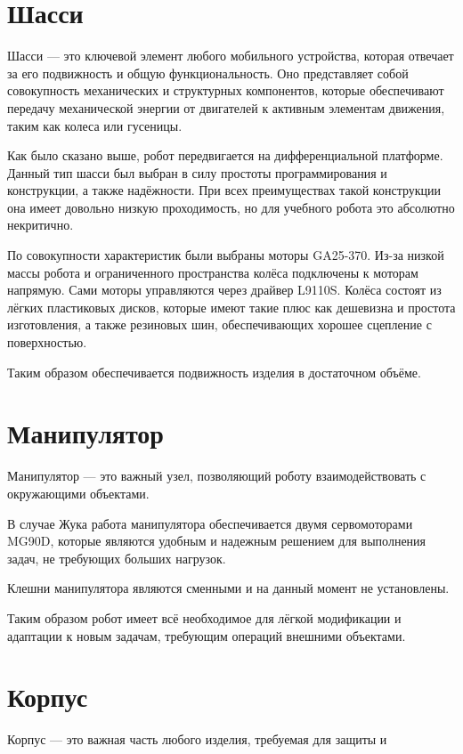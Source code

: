 \section{Шасси}

Шасси --- это ключевой элемент любого мобильного устройства, которая отвечает за его подвижность и общую функциональность. Оно представляет собой совокупность механических и структурных компонентов, которые обеспечивают передачу механической энергии от двигателей к активным элементам движения, таким как колеса или гусеницы.

Как было сказано выше, робот передвигается на дифференциальной платформе. Данный тип шасси был выбран в силу простоты программирования и конструкции, а также надёжности. При всех преимуществах такой конструкции она имеет довольно низкую проходимость, но для учебного робота это абсолютно некритично.

По совокупности характеристик были выбраны моторы GA25-370. Из-за низкой массы робота и ограниченного пространства колёса подключены к моторам напрямую. Сами моторы управляются через драйвер L9110S. Колёса состоят из лёгких пластиковых дисков, которые имеют такие плюс как дешевизна и простота изготовления, а также резиновых шин, обеспечивающих хорошее сцепление с поверхностью.

Таким образом обеспечивается подвижность изделия в достаточном объёме.

\section{Манипулятор}

Манипулятор --- это важный узел, позволяющий роботу взаимодействовать с окружающими объектами.

В случае Жука работа манипулятора обеспечивается двумя сервомоторами MG90D, которые являются удобным и надежным
решением для выполнения задач, не требующих больших нагрузок.

Клешни манипулятора являются сменными и на данный момент не установлены.

Таким образом робот имеет всё необходимое для лёгкой модификации и адаптации к новым задачам, требующим операций внешними объектами.

\section{Корпус}

Корпус --- это важная часть любого изделия, требуемая для защиты и

